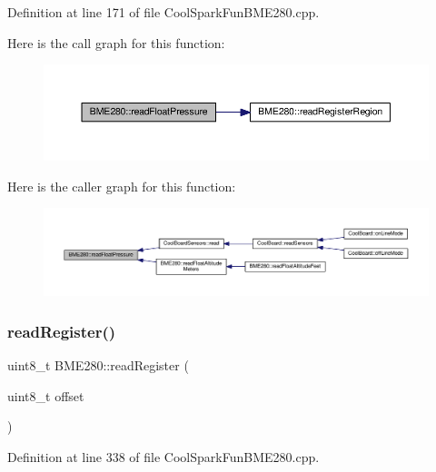 Definition at line 171 of file Cool\+Spark\+Fun\+B\+M\+E280.\+cpp.

Here is the call graph for this function\+:\nopagebreak
\begin{figure}[H]
\begin{center}
\leavevmode
\includegraphics[width=350pt]{class_b_m_e280_ada6e799917afb4f228e6253bc56ffe75_cgraph}
\end{center}
\end{figure}
Here is the caller graph for this function\+:\nopagebreak
\begin{figure}[H]
\begin{center}
\leavevmode
\includegraphics[width=350pt]{class_b_m_e280_ada6e799917afb4f228e6253bc56ffe75_icgraph}
\end{center}
\end{figure}
\mbox{\label{class_b_m_e280_a1bbd14c8591966df531e40085342ff71}} 
\subsubsection{\texorpdfstring{read\+Register()}{readRegister()}}
{\footnotesize\ttfamily uint8\+\_\+t B\+M\+E280\+::read\+Register (\begin{DoxyParamCaption}\item[{uint8\+\_\+t}]{offset }\end{DoxyParamCaption})}



Definition at line 338 of file Cool\+Spark\+Fun\+B\+M\+E280.\+cpp.

